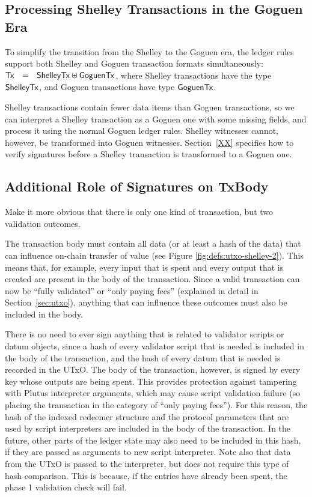 \subsection{Processing Shelley Transactions in the Goguen Era}

To simplify the transition from the Shelley to the Goguen era, the
ledger rules support both Shelley and Goguen transaction formats
simultaneously: $\mathsf{Tx} ~~=~~ \mathsf{ShelleyTx} \uplus \mathsf{GoguenTx}$, where
Shelley transactions have the type $\mathsf{ShelleyTx}$, and Goguen
transactions have type $\mathsf{GoguenTx}$.

Shelley transactions contain fewer data items than Goguen transactions, so we can interpret
a Shelley transaction as a Goguen one with some missing fields, and process it using the normal Goguen ledger
rules.  Shelley witnesses cannot, however, be transformed into Goguen witnesses.
Section~\ref{XX} specifies how to verify signatures before a
Shelley transaction is transformed to a Goguen one.

\subsection{Additional Role of Signatures on TxBody}
\begin{note}
  Make it more obvious that there is only one kind of transaction, but two validation outcomes.
\end{note}
The transaction body must contain all data
(or at least a hash of the data) that can influence
on-chain transfer of value
(see Figure \ref{fig:defs:utxo-shelley-2}).
This means that, for example,
every input that is spent and every output that is created are present in the body of the transaction.
Since a valid transaction can now be ``fully validated'' or ``only paying
fees'' (explained in detail in Section~\ref{sec:utxo}), anything that
can influence these outcomes must also be included in the body.

There is no need to ever sign anything that is related to validator scripts or datum objects,
since a hash of every validator script that is needed
is included in the body of the transaction, and the hash of every datum that is needed
is recorded in the UTxO.
%
The body of the transaction, however, is signed by every key
whose outputs are being spent.
This provides
protection against tampering with Plutus interpreter arguments, which may cause
script validation failure (so placing the transaction in the category of ``only paying fees'').
For this reason, the hash of the indexed redeemer structure and the protocol parameters that are used by
script interpreters are included in the body of the transaction. In the future, other parts of the ledger
state may also need to be included in this hash, if they are passed as
arguments to new script interpreter. Note also that data from the UTxO
is passed to the interpreter, but does not require this type of hash comparison.
This is because, if the entries
have already been spent, the phase 1 validation check will fail.


